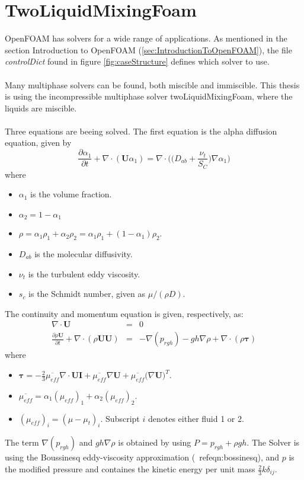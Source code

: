 \documentclass[a4paper, 12pt]{report}
\begin{document}
\section{TwoLiquidMixingFoam}
\label{sec:TwoLiquidMixingFoam}
OpenFOAM has solvers for a wide range of applications. As mentioned in the section Introduction to OpenFOAM (\ref{sec:IntroductionToOpenFOAM}), the file \textit{controlDict} found in figure \ref{fig:caseStructure} defines which solver to use.\\
\\
Many multiphase solvers can be found, both miscible and immiscible. This thesis is using the incompressible multiphase solver twoLiquidMixingFoam, where the liquids are miscible.\\
\\
Three equations are beeing solved. The first equation is the alpha diffusion equation, given by \cite{Krpan}
\begin{equation}
\frac{\partial \alpha_1}{\partial t} + \nabla \cdot (\mathbf{U} \alpha_1) = \nabla \cdot \Big(\big(D_{ab} + \frac{\nu_t}{S_C}  \big)\nabla \alpha_1 \Big) 
\label{eqn:alphaEqTLMF}
\end{equation}
where
\begin{itemize}
	\item $\alpha_1$ is the volume fraction.
	\item $\alpha_2 = 1 - \alpha_1$	
	\item $\rho = \alpha_1 \rho_1 + \alpha_2 \rho_2 = \alpha_1\rho_1 + (1 - \alpha_1)\rho_2$.
	\item $D_{ab}$ is the molecular diffusivity.
	\item $\nu_t$ is the turbulent eddy viscosity.
	\item $s_c$ is the Schmidt number, given as $\mu / (\rho D)$.
\end{itemize}
The continuity and momentum equation is given, respectively, as: 
\begin{eqnarray}
\label{eqn:continuityTLMF}
\nabla \cdot \mathbf{U} &=& 0 \\
\label{eqn:momentumTLMF}
\frac{\partial \rho \mathbf{U}}{\partial t} + \nabla \cdot(\rho \mathbf{U} \mathbf{U}) &=& - \nabla (p_{rgh}) - gh\nabla \rho + \nabla \cdot (\rho \boldsymbol{\tau})
\end{eqnarray}
where 
\begin{itemize}
	\item $\boldsymbol{\tau} = -\frac{2}{3}\overline{\mu_{eff}}\nabla \cdot \mathbf{U} \mathbf{I} + \overline{\mu_{eff}}\nabla \mathbf{U} + \overline{\mu_{eff}}\big(\nabla \mathbf{U}\big)^T$.
	\item $\overline{\mu_{eff}} = \alpha_1 (\mu_{eff})_1 + \alpha_2 (\mu_{eff})_2$.
	\item $(\mu_{eff})_i = (\mu - \mu_t)_i$. Subscript $i$ denotes either fluid 1 or 2.
\end{itemize}
The term $\nabla(p_{rgh})$ and $gh \nabla \rho$ is obtained by using $P = p_{rgh} + \rho gh$. The Solver is using the Boussinesq eddy-viscosity approximation (\
ref{eqn:bossinesq}), and $p$ is the modified pressure and containes the kinetic energy per unit mass $\frac{2}{3}k\delta_{ij}$.
\end{document}
